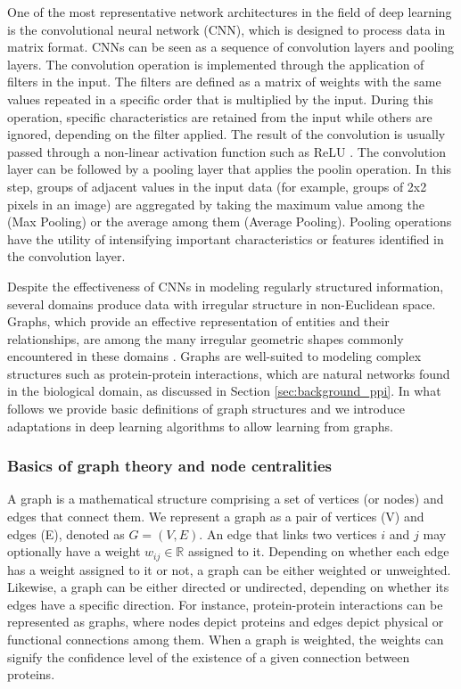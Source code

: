 One of the most representative network architectures in the field of deep learning is the convolutional neural network (CNN), which is designed to process data in matrix format. CNNs can be seen as a sequence of convolution layers and pooling layers. The convolution operation is implemented through the application of filters in the input. The filters are defined as a matrix of weights with the same values repeated in a specific order that is multiplied by the input. During this operation, specific characteristics are retained from the input while others are ignored, depending on the filter applied. The result of the convolution is usually passed through a non-linear activation function such as ReLU \cite{li2021survey, lecun2015deep}. The convolution layer can be followed by a pooling layer that applies the poolin operation. In this step, groups of adjacent values in the input data (for example, groups of 2x2 pixels in an image) are aggregated by taking the maximum value among the (\ie Max Pooling) or the average among them (\ie Average Pooling). Pooling operations have the utility of intensifying important characteristics or features identified in the convolution layer. 

Despite the effectiveness of CNNs in modeling regularly structured information, several domains produce data with irregular structure in non-Euclidean space. Graphs, which provide an effective representation of entities and their relationships, are among the many irregular geometric shapes commonly encountered in these domains \cite{georgousis2021graph}. Graphs are well-suited to modeling complex structures such as protein-protein interactions, which are natural networks found in the biological domain, as discussed in Section \ref{sec:background_ppi}. In what follows we provide basic definitions of graph structures and we introduce adaptations in deep learning algorithms to allow learning from graphs.




\subsubsection{Basics of graph theory and node centralities}
\label{cap:basis_graph_centralities}


A graph is a mathematical structure comprising a set of vertices (or nodes) and edges that connect them. We represent a graph as a pair of vertices (V) and edges (E), denoted as $G = (V, E)$. An edge that links two vertices $i$ and $j$ may optionally have a weight $w_{ij} \in \mathbb{R}$ assigned to it. Depending on whether each edge has a weight assigned to it or not, a graph can be either weighted or unweighted. Likewise, a graph can be either directed or undirected, depending on whether its edges have a specific direction. For instance, protein-protein interactions can be represented as graphs, where nodes depict proteins and edges depict physical or functional connections among them. When a graph is weighted, the weights can signify the confidence level of the existence of a given connection between proteins.



